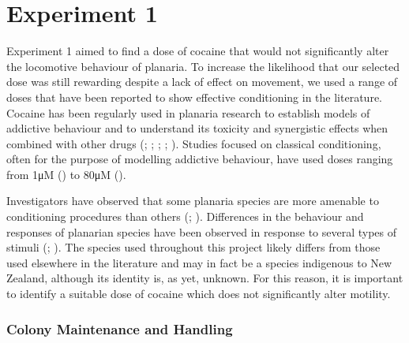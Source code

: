 \documentclass[
  jou,
  floatsintext,
  longtable,
  nolmodern,
  notxfonts,
  notimes,
  donotrepeattitle,
  colorlinks=true,linkcolor=blue,citecolor=blue,urlcolor=blue]{apa7}
\begin{document}
\section{Experiment 1}\label{sec-experiment-1}

Experiment 1 aimed to find a dose of cocaine that would not
significantly alter the locomotive behaviour of planaria. To increase
the likelihood that our selected dose was still rewarding despite a lack
of effect on movement, we used a range of doses that have been reported
to show effective conditioning in the literature. Cocaine has been
regularly used in planaria research to establish models of addictive
behaviour and to understand its toxicity and synergistic effects when
combined with other drugs
(; ; ; ;
). Studies
focused on classical conditioning, often for the purpose of modelling
addictive behaviour, have used doses ranging from 1μM
() to
80μM ().

Investigators have observed that some planaria species are more amenable
to conditioning procedures than others
(;
).
Differences in the behaviour and responses of planarian species have
been observed in response to several types of stimuli
(; ). The
species used throughout this project likely differs from those used
elsewhere in the literature and may in fact be a species indigenous to
New Zealand, although its identity is, as yet, unknown. For this reason,
it is important to identify a suitable dose of cocaine which does not
significantly alter motility.

\subsubsection{Colony Maintenance and
Handling}\label{colony-maintenance-and-handling}
\end{document}
